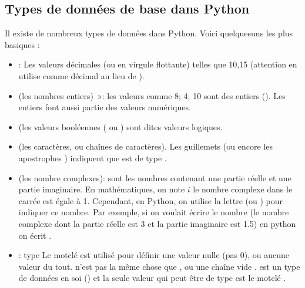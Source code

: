\documentclass[letterpaper,10pt,french]{sphinxmanual}
\begin{document}
\subsection{Types de données de base dans Python}
\label{\detokenize{ch1:types-de-donnees-de-base-dans-python}}
\sphinxAtStartPar
Il existe de nombreux types de données dans Python. Voici quelques\sphinxhyphen{}uns les plus basiques :
\begin{itemize}
\item {} 
\sphinxAtStartPar
{}: Les valeurs décimales (ou en virgule flottante) telles que 10,15 (attention en utilise  comme décimal au lieu de \sphinxcode{\sphinxupquote{,}}).

\item {} 
\sphinxAtStartPar
{} (les nombres entiers) »: les valeurs comme 8; 4; 10 sont des entiers (). Les entiers font aussi partie des valeurs numériques.

\item {} 
\sphinxAtStartPar
{} (les valeurs booléennes ( ou ) sont dites valeurs logiques.

\item {} 
\sphinxAtStartPar
{} (les caractères, ou chaînes de caractères). Les guillemets  (ou encore les apostrophes ) indiquent que  est de type .

\item {} 
\sphinxAtStartPar
{}(les nombre complexes):  sont les nombres contenant une partie réelle et une partie imaginaire. En mathématiques, on note \(i\) le nombre complexe dans le carrée est égale à 1. Cependant, en Python, on utilise la lettre  (ou ) pour indiquer ce nombre. Par exemple, si on voulait écrire le nombre  (le nombre complexe dont la partie réelle est 3 et la partie imaginaire est 1.5) en python on écrit .

\item {} 
\sphinxAtStartPar
{}: type Le mot\sphinxhyphen{}clé  est utilisé pour définir une valeur nulle (pas 0), ou aucune valeur du tout.  n’est pas la même chose que ,  ou une chaîne vide \sphinxcode{\sphinxupquote{\textquotesingle{}\textquotesingle{}}}.  est un type de données en soi () et la seule valeur qui peut être de type  est le mot\sphinxhyphen{}clé .

\end{itemize}
\end{document}
